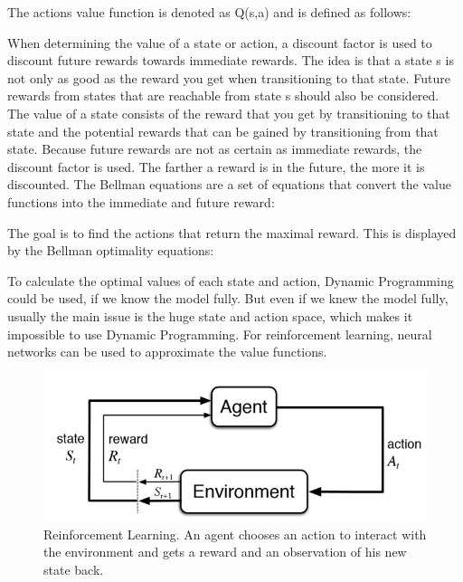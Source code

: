 
The actions value function is denoted as Q(s,a) and is defined as follows:



When determining the value of a state or action, a discount factor 
is used to discount future rewards towards immediate rewards. 
The idea is that a state s is not only as good as the reward you get when transitioning to that state. Future rewards from states that are reachable from state s should also be considered. The value of a state consists of the reward that you get by transitioning to that state and the potential rewards that can be gained by transitioning from that state. 
Because future rewards are not as certain as immediate rewards, the discount factor is used. The farther a reward is in the future, the more it is discounted. 
The Bellman equations are a set of equations that convert the value functions into the immediate and future reward:


The goal is to find the actions that return the maximal reward. This is displayed by the Bellman optimality equations:



To calculate the optimal values of each state and action, Dynamic Programming could be used, if we know the model fully. But even if we knew the model fully, usually the main issue is the huge state and action space, which makes it impossible to use Dynamic Programming. For reinforcement learning, neural networks can be used to approximate the value functions. 




\begin{figure}
	
	\centering
	\includegraphics[width=1\textwidth]{figures/rl_general.jpg}
	\caption{Reinforcement Learning. An agent chooses an action to interact with the environment and gets a reward and an observation of his new state back. %
		}
\end{figure}

